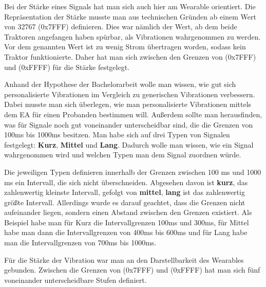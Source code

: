 Bei der St{\"a}rke eines Signals hat man sich auch hier am Wearable orientiert. 
Die Repr{\"a}sentation der St{\"a}rke musste man aus technischen Gr{\"u}nden ab einem Wert von 32767 (0x7FFF) definieren. Dies war n{\"a}mlich der Wert, ab dem beide Traktoren angefangen haben sp{\"u}rbar, als Vibrationen wahrgenommen zu werden.
Vor dem genannten Wert ist zu wenig Strom {\"u}bertragen worden, sodass kein Traktor funktionierte.
Daher hat man sich zwischen den Grenzen von (0x7FFF) und (0xFFFF) f{\"u}r die St{\"a}rke festgelegt. 

Anhand der Hypothese der Bachelorarbeit wolle man wissen, wie gut sich personalisierte Vibrationen im Vergleich zu generischen Vibrationen verbessern. Dabei musste man sich {\"u}berlegen, wie man personalisierte Vibrationen mittels dem EA f{\"u}r einen Probanden bestimmen will.
Au{\ss}erdem sollte man herausfinden, was f{\"u}r Signale noch gut voneinander unterscheidbar sind, die die Grenzen von 100ms bis 1000ms besitzen.
Man habe sich auf drei Typen von Signalen festgelegt: \textbf{Kurz}, \textbf{Mittel} und \textbf{Lang}. Dadurch wolle man wissen, wie ein Signal wahrgenommen wird und welchen Typen man dem Signal zuordnen w{\"u}rde.

Die jeweiligen Typen definieren innerhalb der Grenzen zwischen 100 ms und 1000 ms ein Intervall, die sich nicht {\"u}berschneiden. Abgesehen davon ist \textbf{kurz}, das zahlenwertig kleinste Intervall, gefolgt von \textbf{mittel}, \textbf{lang} ist das zahlenwertig gr{\"o}{\ss}te Intervall.
Allerdings wurde es darauf geachtet, dass die Grenzen nicht aufeinander liegen, sondern einen Abstand zwischen den Grenzen existiert.
Als Beispiel habe man f{\"u}r Kurz die Intervallgrenzen 100ms und 300ms, f{\"u}r Mittel habe man dann die Intervallgrenzen von 400ms bis 600ms und f{\"u}r Lang habe man die Intervallgrenzen von 700ms bis 1000ms. 

F{\"u}r die St{\"a}rke der Vibration war man an den Darstellbarkeit des Wearables gebunden. Zwischen die Grenzen von (0x7FFF) und (0xFFFF) hat man sich f{\"u}nf voneinander unterscheidbare Stufen definiert.




